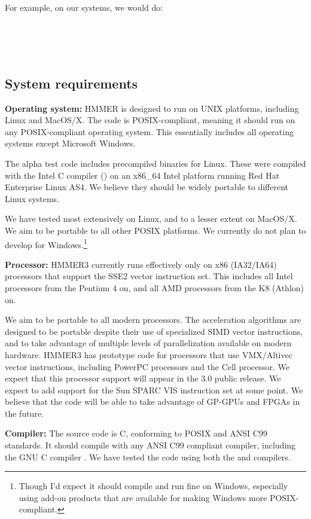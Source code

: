 For example, on our systems, we would do:

\\
\\
\\


\subsection{System requirements}

\textbf{Operating system:} HMMER is designed to run on UNIX platforms,
including Linux and MacOS/X. The code is POSIX-compliant, meaning it
should run on any POSIX-compliant operating system. This essentially
includes all operating systems except Microsoft Windows.  

The alpha test code includes precompiled binaries for Linux. These
were compiled with the Intel C compiler () on an x86\_64
Intel platform running Red Hat Enterprise Linux AS4. We believe they
should be widely portable to different Linux systems. 

We have tested most extensively on Linux, and to a lesser extent on
MacOS/X. We aim to be portable to all other POSIX platforms.  We
currently do not plan to develop for Windows.\footnote{Though I'd
expect it should compile and run fine on Windows, especially using
add-on products that are available for making Windows more
POSIX-compliant.}

\textbf{Processor:} HMMER3 currently runs effectively only on x86
(IA32/IA64) processors that support the SSE2 vector instruction set.
This includes all Intel processors from the Pentium 4 on, and all AMD
processors from the K8 (Athlon) on.

We aim to be portable to all modern processors. The acceleration
algorithms are designed to be portable despite their use of
specialized SIMD vector instructions, and to take advantage of
multiple levels of parallelization available on modern hardware.
HMMER3 has prototype code for processors that use VMX/Altivec vector
instructions, including PowerPC processors and the Cell processor. We
expect that this processor support will appear in the 3.0 public
release. We expect to add support for the Sun SPARC VIS instruction
set at some point. We believe that the code will be able to take
advantage of GP-GPUs and FPGAs in the future.

\textbf{Compiler:} The source code is C, conforming to POSIX and ANSI
C99 standards. It should compile with any ANSI C99 compliant compiler,
including the GNU C compiler .  We have tested the code
using both the  and  compilers.

